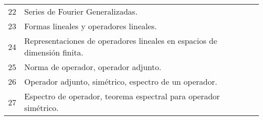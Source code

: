 \begin{table}[H]
\begin{tabular}{||c|p{13cm}||c||}
		\hline
			22 & Series de Fourier Generalizadas. & \\
			23 & Formas lineales y operadores lineales. & \\
			24 & Representaciones de operadores lineales en espacios de dimensión finita. & \\
			25 & Norma de operador, operador adjunto. & \\
			26 & Operador adjunto, simétrico, espectro de un operador. & \\
			27 & Espectro de operador, teorema espectral para operador simétrico. & \\
		\hline
		\hline
	\end{tabular}
\end{table}










